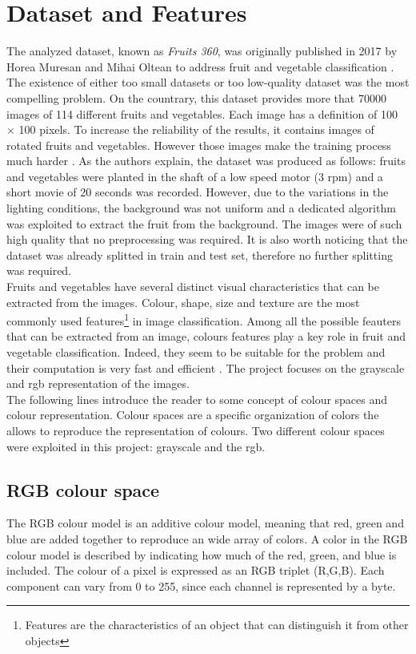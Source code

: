 \documentclass{article}
\begin{document}
\section{Dataset and Features}
The analyzed dataset, known as \textit{Fruits 360}, was originally published in 2017  by Horea Muresan and Mihai Oltean to address fruit and vegetable classification \cite{dataset}. The existence of either too small datasets or too low-quality dataset was the most compelling problem.  On the countrary, this dataset provides more that 70000 images of 114 different fruits and vegetables. Each image has a definition of 100 $\times$ 100 pixels. To increase the reliability of the results, it contains images of rotated fruits and vegetables. However those images make the training process much harder .
As the authors explain, the dataset was produced as follows: fruits and vegetables were planted in the shaft of a low speed motor (3 rpm) and a short movie of 20 seconds was recorded. However, due to the variations in the lighting conditions, the background was not uniform and a dedicated algorithm was exploited to extract the fruit from the background. The images were of such high quality that no preprocessing was required.
It is also worth noticing that the dataset was already splitted in train and test set, therefore no further splitting was required.\\
Fruits and vegetables have several distinct visual characteristics that can be extracted from the images. Colour, shape, size and texture are the most commonly used features\footnote{Features are the characteristics of an object that can distinguish it from other objects} in image classification.  Among all the possible feauters that can be extracted from an image, colours features play a key role in fruit and vegetable classification. Indeed, they seem to be suitable for the problem and their computation is very fast and efficient \cite{review}. The project focuses on the grayscale and rgb representation of the images. \\
The following lines introduce the reader to some concept of colour spaces and colour representation.
Colour spaces are a specific organization of colors the allows to  reproduce the representation of colours. Two different colour spaces were exploited in this project: grayscale and the rgb.
\subsection{RGB colour space}
The RGB colour model is an additive colour model, meaning that red, green and blue are added together to reproduce an wide array of colors. A color in the RGB colour model is described by indicating how much of the red, green, and blue is included. The colour of a pixel is expressed as an RGB triplet (R,G,B). Each component can vary from 0 to 255, since each channel is represented by a byte.
\end{document}
